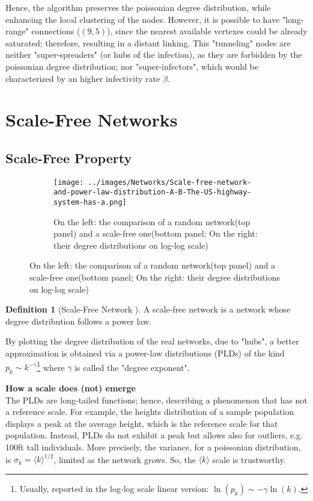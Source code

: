 \documentclass[a4paper,12pt,twoside]{book} %
\theoremstyle{definition}
\newtheorem{definition}{Definition}[section]
\begin{document}
Hence, the algorithm preserves the poissonian degree distribution, while enhancing the local clustering of the nodes. However, it is possible to have "long-range" connections ($(9,5)$), since the nearest available vertexes could be already saturated; therefore, resulting in a distant linking. This "tunneling" nodes are neither "super-spreaders" (or hubs of the infection), as they are forbidden by the poissonian degree distribution; nor "super-infectors", which would be characterized by an higher infectivity rate $\beta$.

\newpage
\section{Scale-Free Networks}
\subsection{Scale-Free Property}

\begin{figure}[h]
    \begin{subfigure}{\textwidth}
        \texttt{[image: ../images/Networks/Scale-free-network-and-power-law-distribution-A-B-The-US-highway-system-has-a.png]}
        \centering
        \caption{On the left: the comparison of a random network(top panel) and a scale-free one(bottom panel; On the right: their degree distributions on log-log scale) \cite{barabasi::2016networkbook}}
        \label{fig:PLDsVSEBDs}
    \end{subfigure}
\end{figure}

\begin{definition}[Scale-Free Network \cite{Barabasi:1999_ScalRndNet}]
	A scale-free network is a network whose degree distribution follows a power law.
\end{definition}

By plotting the degree distribution of the real networks, due to "hubs", a better approximation is obtained via a power-law distributions (PLDs) of the kind $p_k \sim k^{-\gamma}$\footnote{Usually, reported in the log-log scale linear version: $\ln(p_k) \sim -\gamma \ln(k)$.}  where $\gamma$ is called the "degree exponent". 

{\large \textbf{How a scale does (not) emerge}} \\
The PLDs are long-tailed functions; hence, describing a phenomenon that has not a reference scale.
For example, the heights distribution of a sample population displays a peak at the average height, which is the reference scale for that population. Instead, PLDs do not exhibit a peak but allows also for outliers, e.g. 100ft tall individuals.
More precisely, the variance, for a poissonian distribution, is $\sigma_k = \langle k \rangle ^ {1/2}$, limited as the network grows. So, the $\langle k \rangle$ scale is trustworthy. 
\end{document}

